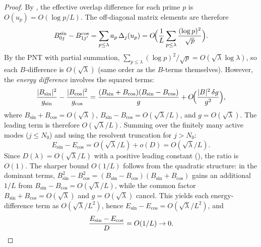 \documentclass[12pt,a4paper]{article}
\theoremstyle{definition}
\theoremstyle{remark}
\begin{document}
\begin{proof}
By , the effective overlap difference for each prime $p$ is $O(u_p) = O(\log p/L)$. The off-diagonal matrix elements are therefore
\[
  B_{0j}^{\sin} - B_{1j'}^{\cos} = \sum_{p \leq \lambda} a_p\,\Delta_j(u_p) = O\!\Bigl(\frac{1}{L}\sum_{p \leq \lambda}\frac{(\log p)^2}{\sqrt{p}}\Bigr).
\]
By the PNT with partial summation, $\sum_{p \leq \lambda}(\log p)^2/\sqrt{p} = O(\sqrt{\lambda}\log\lambda)$, so each $B$-difference is $O(\sqrt{\lambda})$ (same order as the $B$-terms themselves). However, the \emph{energy difference} involves the squared terms:
\[
  \frac{|B_{\sin}|^2}{g_{\sin}} - \frac{|B_{\cos}|^2}{g_{\cos}} = \frac{(B_{\sin}+B_{\cos})(B_{\sin}-B_{\cos})}{g} + O\!\Bigl(\frac{|B|^2\,\delta g}{g^2}\Bigr),
\]
where $B_{\sin} + B_{\cos} = O(\sqrt{\lambda})$, $B_{\sin} - B_{\cos} = O(\sqrt{\lambda}/L)$, and $g = O(\sqrt{\lambda})$. The leading term is therefore $O(\sqrt{\lambda}/L)$. Summing over the finitely many active modes ($j \leq N_0$) and using the resolvent truncation for $j > N_0$:
\[
  E_{\sin} - E_{\cos} = O(\sqrt{\lambda}/L) + o(D) = O(\sqrt{\lambda}/L).
\]
Since $D(\lambda) = O(\sqrt{\lambda}/L)$ with a positive leading constant (), the ratio is $O(1)$. The sharper bound $O(1/L)$ follows from the quadratic structure: in the dominant terms, $B_{\sin}^2 - B_{\cos}^2 = (B_{\sin}-B_{\cos})(B_{\sin}+B_{\cos})$ gains an additional $1/L$ from $B_{\sin}-B_{\cos} = O(\sqrt{\lambda}/L)$, while the common factor $B_{\sin}+B_{\cos} = O(\sqrt{\lambda})$ and $g = O(\sqrt{\lambda})$ cancel. This yields each energy-difference term as $O(\sqrt{\lambda}/L^2)$, hence $E_{\sin}-E_{\cos} = O(\sqrt{\lambda}/L^2)$, and
\[
  \frac{E_{\sin}-E_{\cos}}{D} = O(1/L) \to 0. \qedhere
\]
\end{proof}




\end{document}
